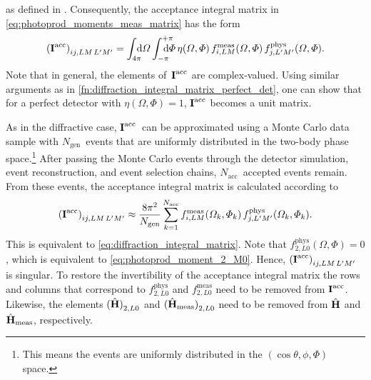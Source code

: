 as defined in
.
Consequently, the acceptance integral matrix in
\cref{eq:photoprod_moments_meas_matrix} has the form
\begin{equation}
  \label{eq:photoprod_integral_matrix}
  \rBrk[0]{\mat{I}^\text{acc}}_{i j, L M\, L' M'}
  = \int_{4 \pi}\!\!\!\! \dif{\Omega} \int_{-\pi}^{+\pi}\hspace{-1.2em} \dif{\Phi}\,
  \eta(\Omega, \Phi)\,
  f_{i, L M}^\text{meas}(\Omega, \Phi)\,
  f_{j, L' M'}^\text{phys}(\Omega, \Phi).
\end{equation}
Note that in general, the elements of~$\bm{\mathrm{I}}^\text{acc}$ are
complex-valued.  Using similar arguments as in
\cref{fn:diffraction_integral_matrix_perfect_det}, one can show that
for a perfect detector with $\eta(\Omega, \Phi) = 1$,
$\bm{\mathrm{I}}^\text{acc}$ becomes a unit matrix.

As in the diffractive case, $\bm{\mathrm{I}}^\text{acc}$~can be approximated
using a Monte Carlo data sample with $N_\text{gen}$~events that are
uniformly distributed in the two-body phase space.\footnote{This means
the events are uniformly distributed in the $(\cos\theta, \phi, \Phi)$
space.}  After passing the Monte Carlo events through the detector
simulation, event reconstruction, and event selection chains,
$N_\text{acc}$~accepted events remain.  From these events, the
acceptance integral matrix is calculated according to
\begin{equation}
  \label{eq:photoprod_integral_matrix_mc}
  \rBrk[0]{\mat{I}^\text{acc}}_{i j, L M\, L' M'}
  \approx \frac{8 \pi^2}{N_\text{gen}} \sum_{k = 1}^{N_\text{acc}}
  f_{i, L M}^\text{meas}(\Omega_k, \Phi_k)\,
  f_{j, L' M'}^\text{phys}(\Omega_k, \Phi_k).
\end{equation}
This is equivalent to \cref{eq:diffraction_integral_matrix}.  Note
that $f^\text{phys}_{2, L 0}(\Omega, \Phi) = 0$, which is equivalent
to \cref{eq:photoprod_moment_2_M0}.  Hence,
$\rBrk[0]{\mat{I}^\text{acc}}_{i j, L M\, L' M'}$ is singular.  To
restore the invertibility of the acceptance integral matrix the rows
and columns that correspond to $f^\text{phys}_{2, L 0}$ and
$f^\text{meas}_{2, L 0}$ need to be removed from $\bm{\mathrm{I}}^\text{acc}$.
Likewise, the elements $\rBrk[0]{\hat{\vect{H}}}_{2, L 0}$ and
$\rBrk[0]{\hat{\vect{H}}_\text{meas}}_{2, L 0}$ need to be removed
from $\hat{\bm{\mathrm{H}}}$ and $\hat{\bm{\mathrm{H}}}_\text{meas}$, respectively.

